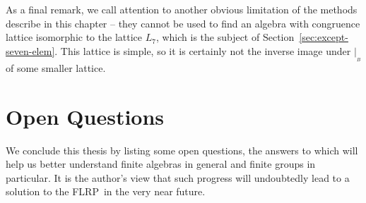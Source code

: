 \documentclass[cm,dissertation,actual,final]{uhthesis}
\theoremstyle{plain}
\theoremstyle{definition}
\theoremstyle{remark}
\numberwithin{theorem}{section}
\numberwithin{claim}{chapter}
\numberwithin{equation}{section}
\numberwithin{conjecture}{chapter}
\newcommand{\<}{\ensuremath{\langle}}
\renewcommand{\>}{\ensuremath{\rangle}}
\newcommand{\FLRP}{{\small FLRP}}
\newcommand{\0}{\ensuremath{\mathbf{0}}}
\newcommand{\1}{\ensuremath{\mathbf{1}}}
\newcommand{\2}{\ensuremath{\mathbf{2}}}
\newcommand{\3}{\ensuremath{\mathbf{3}}}
\newcommand{\4}{\ensuremath{\mathbf{4}}}
\newcommand{\5}{\ensuremath{\mathbf{5}}}
\newcommand{\resB}{\ensuremath{|_{_B}}}
\begin{document}
  As a final remark, we call attention to another obvious limitation of
  the methods describe in this chapter -- they cannot be used to find an
  algebra with congruence lattice isomorphic to the lattice $L_7$, which is the
  subject of Section~\ref{sec:except-seven-elem}.  
  This lattice is simple, so it is certainly not the inverse image under $\resB$ of some
  smaller lattice. 

\chapter{Open Questions}
\label{sec:open-questions}
We conclude this thesis by listing some open questions, the answers to which
will help us better understand finite algebras in general and finite groups in
particular.  It is the author's view that such progress will undoubtedly lead to
a solution to the \FLRP\ in the very near future.
\end{document}
